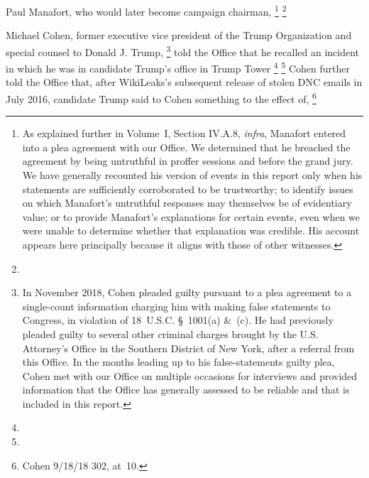 Paul Manafort, who would later become campaign chairman, %
\footnote{\label{fnOneNineSeven}As explained further in Volume~I, Section IV.A.8, \textit{infra}, Manafort entered into a plea agreement with our Office.
We determined that he breached the agreement by being untruthful in proffer sessions and before the grand jury.
We have generally recounted his version of events in this report only when his statements are sufficiently corroborated to be trustworthy;
to identify issues on which Manafort's untruthful responses may themselves be of evidentiary value;
or to provide Manafort's explanations for certain events, even when we were unable to determine whether that explanation was credible.
His account appears here principally because it aligns with those of other witnesses.}
\footnote{}

Michael Cohen, former executive vice president of the Trump Organization and special counsel to Donald J. Trump,%
\footnote{In November 2018, Cohen pleaded guilty pursuant to a plea agreement to a single-count information charging him with making false statements to Congress, in violation of 18~U.S.C. \S~1001(a) \&~(c).
He had previously pleaded guilty to several other criminal charges brought by the U.S. Attorney's Office in the Southern District of New York, after a referral from this Office.
In the months leading up to his false-statements guilty plea, Cohen met with our Office on multiple occasions for interviews and provided information that the Office has generally assessed to be reliable and that is included in this report.}
told the Office that he recalled an incident in which he was in candidate Trump's office in Trump Tower
\footnote{}
\footnote{}
Cohen further told the Office that, after WikiLeaks's subsequent release of stolen DNC emails in July 2016, candidate Trump said to Cohen something to the effect of, %
\footnote{Cohen 9/18/18 302, at~10.
  }

